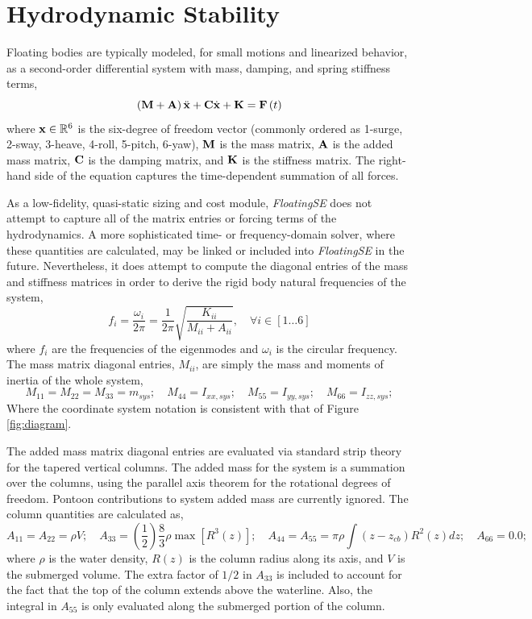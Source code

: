 \section{Hydrodynamic Stability}
Floating bodies are typically modeled, for small motions and linearized
behavior, as a second-order differential system with mass, damping, and
spring stiffness terms,
\begin{equation}
  \left(\mathbf{M} + \mathbf{A}\right)\ddot{\mathbf{x}} + \mathbf{C}\dot{\mathbf{x}} +
  \mathbf{K} = \mathbf{F}\left( t \right)
\end{equation}
where $\mathbf{x}\in\mathbb{R}^6$ is the six-degree of freedom vector
(commonly ordered as 1-surge, 2-sway, 3-heave, 4-roll, 5-pitch,
6-yaw), $\mathbf{M}$ is the mass matrix, $\mathbf{A}$ is the added mass
matrix, $\mathbf{C}$ is the damping matrix, and $\mathbf{K}$ is the stiffness
matrix.  The right-hand side of the equation captures the time-dependent
summation of all forces.

As a low-fidelity, quasi-static sizing and cost module,
\textit{FloatingSE} does not attempt to capture all of the matrix
entries or forcing terms of the hydrodynamics.  A more sophisticated
time- or frequency-domain solver, where these quantities are calculated,
may be linked or included into \textit{FloatingSE} in the future.
Nevertheless, it does attempt to compute the diagonal entries of the
mass and stiffness matrices in order to derive the rigid body natural
frequencies of the system,
\begin{equation}
  f_i = \frac{\omega_i}{2\pi} =
  \frac{1}{2\pi}\sqrt{\frac{K_{ii}}{M_{ii}+A_{ii}}}, \quad \forall i \in
  \left[1\ldots6\right]
\end{equation}
where $f_i$ are the frequencies of the eigenmodes and $\omega_i$ is the
circular frequency.  The mass matrix diagonal entries, $M_{ii}$, are simply the mass and
moments of inertia of the whole system,
\begin{equation}
  M_{11} = M_{22} = M_{33} = m_{sys};\quad M_{44} = I_{xx,sys};\quad M_{55} = I_{yy,sys};\quad M_{66} = I_{zz,sys};
\end{equation}
Where the coordinate system notation is consistent with that of Figure
\ref{fig:diagram}.

The added mass matrix diagonal entries are evaluated via standard strip
theory for the tapered vertical columns.  The added mass for the system is a
summation over the columns, using the parallel axis theorem for the
rotational degrees of freedom.  Pontoon contributions to system added
mass are currently ignored.  The column quantities are calculated as,
\begin{equation}
  A_{11} = A_{22} = \rho V;\quad A_{33} = 
  \left(\frac{1}{2}\right)\frac{8}{3} \rho \max \left[ R^3(z)\right] ; \quad A_{44} =
  A_{55} = \pi\rho\int\left(z-z_{cb}\right)R^2(z)dz;\quad A_{66} = 0.0;
\end{equation}
where $\rho$ is the water density, $R(z)$ is the column radius along its
axis, and $V$ is the submerged volume.  The extra factor of $1/2$ in
$A_{33}$ is included to account for the fact that the top of the column
extends above the waterline.  Also, the integral in $A_{55}$ is only evaluated
along the submerged portion of the column.

